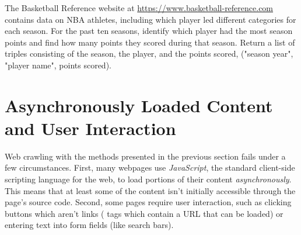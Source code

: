 \begin{problem} %
The Basketball Reference website at \url{https://www.basketball-reference.com} contains data on NBA athletes, including which player led different categories for each season.
For the past ten seasons, identify which player had the most season points and find how many points they scored during that season.
Return a list of triples consisting of the season, the player, and the points scored, ("season year", "player name", points scored).
\end{problem}

\begin{comment} %
\begin{enumerate}
\item Load \url{http://www.google.com/finance} into BeautifulSoup.
Towards the bottom of the web page, there is a Sector summary.
Go through each sector and locate the top five Gainers.
In a SQL table, store the Name, abbreviation, \% Change, and Mkt Cap of the top Gainer for each Sector.

\item Load  into BeautifulSoup.
Go through the top five offensive leaders.
In a SQL table, store the name, career games played, career mins per game, career points per game, and career FG\% for each player.

\item Load \url{http://www.foxsports.com/soccer/united-states-women-team-stats} into BeautifulSoup.
Go though each player on the World Cup US women's team.
In a SQL table, store the name, hometown, position, and \# of games played in the World Cup.
\end{enumerate}
\end{comment}

\section*{Asynchronously Loaded Content and User Interaction} %

Web crawling with the methods presented in the previous section fails under a few circumstances.
First, many webpages use \emph{JavaScript}, the standard client-side scripting language for the web, to load portions of their content  \emph{asynchronously}.
This means that at least some of the content isn't initially accessible through the page's source code.
Second, some pages require user interaction, such as clicking buttons which aren't links ( tags which contain a URL that can be loaded) or entering text into form fields (like search bars).

